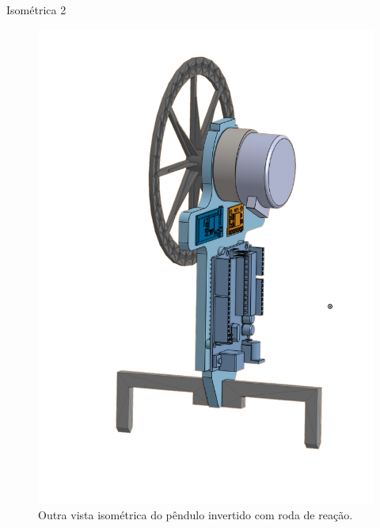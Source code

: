\begin{frame}{Isométrica 2}
    \begin{figure}
        \centering
        \includegraphics[height=0.8\textheight]{iso2.pdf}
        \caption{Outra vista isométrica do pêndulo invertido com roda de reação.}
        \label{fig:iso2}
    \end{figure}
\end{frame}
